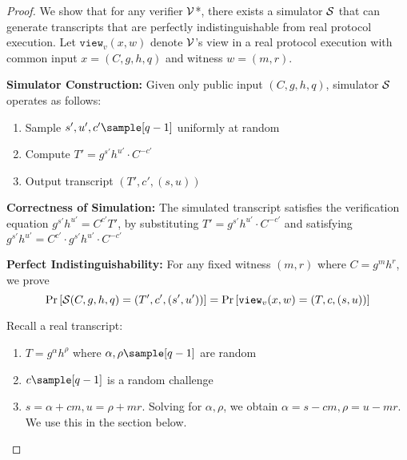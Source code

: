 \begin{proof}
    We show that for any verifier $\mathcal{V}$*, there exists a simulator $\mathcal{S}$ that can generate transcripts that are perfectly indistinguishable from real protocol execution. Let $\texttt{view}_v(x,w)$ denote $\mathcal{V}$'s view in a real protocol execution with common input $x = (C,g,h,q)$ and witness $w = (m,r)$. 

    \noindent \textbf{Simulator Construction: } Given only public input $(C,g,h,q)$, simulator $\mathcal{S}$ operates as follows:
    \begin{enumerate}
        \item Sample $s', u', c' \sample [q-1]$ uniformly at random
        \item  Compute $T' = g^{s'}h^{u'} \cdot C^{-c'}$
        \item Output transcript $(T', c', (s,u))$
    \end{enumerate}

    \noindent \textbf{Correctness of Simulation: } The simulated transcript satisfies the verification equation $g^{s'}h^{u'} = C^{c'}T'$, by substituting $T' = g^{s'}h^{u'} \cdot C^{-c'}$ and satisfying $g^{s'}h^{u'} = C^{c'} \cdot g^{s'}h^{u'} \cdot C^{-c'}$

    \noindent \textbf{Perfect Indistinguishability: } For any fixed witness $(m,r)$ where $C = g^mh^r$, we prove 
    \[
    \Pr \left[ \mathcal{S}(C, g, h, q) = (T',c',(s',u')) \right] = \Pr \left[ \texttt{view}_v(x,w) = (T,c,(s,u)) \right]
    \]
    




\newpage
    
    Recall a real transcript:
    \begin{enumerate}
        \item $T = g^{\alpha}h^{\rho}$ where $\alpha, \rho \sample [q-1]$ are random
        \item $c \sample [q-1]$ is a random challenge
        \item $s = \alpha + cm, u = \rho + mr$. Solving for $\alpha, \rho$, we obtain $\alpha = s - cm, \rho = u - mr$. We use this in the section below.
    \end{enumerate}



\end{proof}
